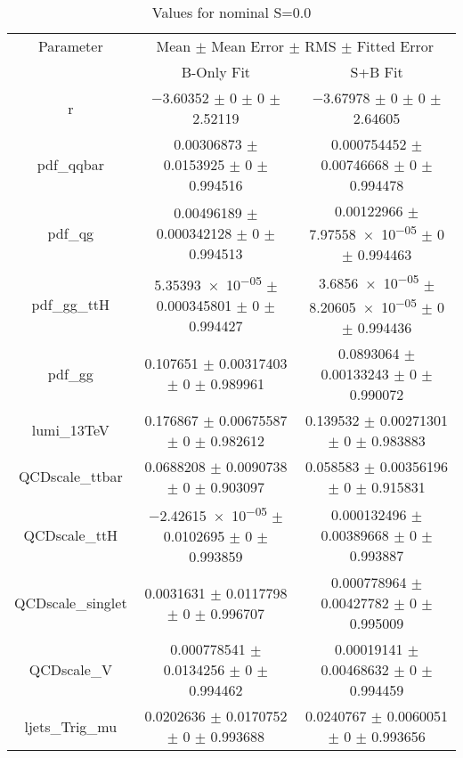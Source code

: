 \begin{table}
\centering
\caption{Values for nominal S=0.0}
\begin{tabular}{ccc}
\toprule
Parameter & \multicolumn{2}{c}{Mean $\pm$ Mean Error $\pm$ RMS $\pm$ Fitted Error}\\
 & B-Only Fit & S+B Fit\\
\midrule
r & \num{-3.60352} $\pm$ \num{0} $\pm$ \num{0} $\pm$ \num{2.52119} & \num{-3.67978} $\pm$ \num{0} $\pm$ \num{0} $\pm$ \num{2.64605}\\
pdf\_qqbar & \num{0.00306873} $\pm$ \num{0.0153925} $\pm$ \num{0} $\pm$ \num{0.994516} & \num{0.000754452} $\pm$ \num{0.00746668} $\pm$ \num{0} $\pm$ \num{0.994478}\\
pdf\_qg & \num{0.00496189} $\pm$ \num{0.000342128} $\pm$ \num{0} $\pm$ \num{0.994513} & \num{0.00122966} $\pm$ \num{7.97558e-05} $\pm$ \num{0} $\pm$ \num{0.994463}\\
pdf\_gg\_ttH & \num{5.35393e-05} $\pm$ \num{0.000345801} $\pm$ \num{0} $\pm$ \num{0.994427} & \num{3.6856e-05} $\pm$ \num{8.20605e-05} $\pm$ \num{0} $\pm$ \num{0.994436}\\
pdf\_gg & \num{0.107651} $\pm$ \num{0.00317403} $\pm$ \num{0} $\pm$ \num{0.989961} & \num{0.0893064} $\pm$ \num{0.00133243} $\pm$ \num{0} $\pm$ \num{0.990072}\\
lumi\_13TeV & \num{0.176867} $\pm$ \num{0.00675587} $\pm$ \num{0} $\pm$ \num{0.982612} & \num{0.139532} $\pm$ \num{0.00271301} $\pm$ \num{0} $\pm$ \num{0.983883}\\
QCDscale\_ttbar & \num{0.0688208} $\pm$ \num{0.0090738} $\pm$ \num{0} $\pm$ \num{0.903097} & \num{0.058583} $\pm$ \num{0.00356196} $\pm$ \num{0} $\pm$ \num{0.915831}\\
QCDscale\_ttH & \num{-2.42615e-05} $\pm$ \num{0.0102695} $\pm$ \num{0} $\pm$ \num{0.993859} & \num{0.000132496} $\pm$ \num{0.00389668} $\pm$ \num{0} $\pm$ \num{0.993887}\\
QCDscale\_singlet & \num{0.0031631} $\pm$ \num{0.0117798} $\pm$ \num{0} $\pm$ \num{0.996707} & \num{0.000778964} $\pm$ \num{0.00427782} $\pm$ \num{0} $\pm$ \num{0.995009}\\
QCDscale\_V & \num{0.000778541} $\pm$ \num{0.0134256} $\pm$ \num{0} $\pm$ \num{0.994462} & \num{0.00019141} $\pm$ \num{0.00468632} $\pm$ \num{0} $\pm$ \num{0.994459}\\
ljets\_Trig\_mu & \num{0.0202636} $\pm$ \num{0.0170752} $\pm$ \num{0} $\pm$ \num{0.993688} & \num{0.0240767} $\pm$ \num{0.0060051} $\pm$ \num{0} $\pm$ \num{0.993656}\\

\end{tabular}
\end{table}
